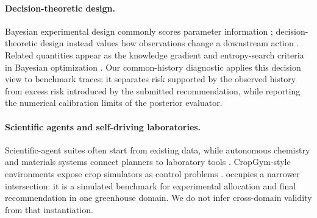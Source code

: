 \paragraph{Decision-theoretic design.}
Bayesian experimental design commonly scores parameter information
\citep{lindley1956,chaloner1995}; decision-theoretic design instead values how observations
change a downstream action \citep{raiffa1961,howard1966}. Related quantities appear as the
knowledge gradient and entropy-search criteria in Bayesian optimization
\citep{frazier2008kg,hennig2012,hernandez2014}. Our common-history diagnostic applies this
decision view to benchmark traces: it separates risk supported by the observed history from
excess risk introduced by the submitted recommendation, while reporting the numerical
calibration limits of the posterior evaluator.

\paragraph{Scientific agents and self-driving laboratories.}
Scientific-agent suites often start from existing data, while autonomous chemistry and
materials systems connect planners to laboratory tools
\citep{scienceagentbench,discoverybench,coscientist,chemcrow,
szymanski2023autonomous,burger2020mobile}. CropGym-style environments expose crop simulators
as control problems \citep{wofostgym}. \slowlab{} occupies a narrower intersection: it is a
simulated benchmark for experimental allocation and final recommendation in one greenhouse
domain. We do not infer cross-domain validity from that instantiation.
